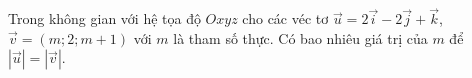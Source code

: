 \begin{bt}%
	Trong không gian với hệ tọa độ $Oxyz$ cho các véc tơ $\overrightarrow{u}=2\overrightarrow{i}-2\overrightarrow{j}+\overrightarrow{k}$, $\overrightarrow{v}=(m;2;m+1)$ với $m$ là tham số thực. Có bao nhiêu  giá trị của $m$ để $|\overrightarrow{u}|=|\overrightarrow{v}|$.
\end{bt}

